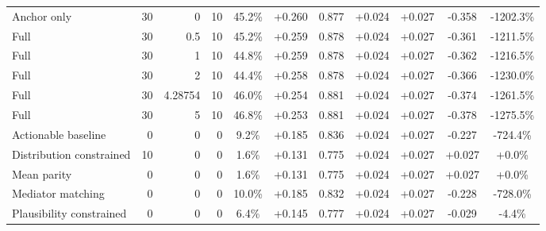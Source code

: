 \begin{table}[htbp]
\begin{tabular}{lrrrccccccc}
Anchor only & 30 & 0 & 10 & 45.2\% & +0.260 & 0.877 & +0.024 & +0.027 & -0.358 & -1202.3\% \\
Full & 30 & 0.5 & 10 & 45.2\% & +0.259 & 0.878 & +0.024 & +0.027 & -0.361 & -1211.5\% \\
Full & 30 & 1 & 10 & 44.8\% & +0.259 & 0.878 & +0.024 & +0.027 & -0.362 & -1216.5\% \\
Full & 30 & 2 & 10 & 44.4\% & +0.258 & 0.878 & +0.024 & +0.027 & -0.366 & -1230.0\% \\
Full & 30 & 4.28754 & 10 & 46.0\% & +0.254 & 0.881 & +0.024 & +0.027 & -0.374 & -1261.5\% \\
Full & 30 & 5 & 10 & 46.8\% & +0.253 & 0.881 & +0.024 & +0.027 & -0.378 & -1275.5\% \\
Actionable baseline & 0 & 0 & 0 & 9.2\% & +0.185 & 0.836 & +0.024 & +0.027 & -0.227 & -724.4\% \\
Distribution constrained & 10 & 0 & 0 & 1.6\% & +0.131 & 0.775 & +0.024 & +0.027 & +0.027 & +0.0\% \\
Mean parity & 0 & 0 & 0 & 1.6\% & +0.131 & 0.775 & +0.024 & +0.027 & +0.027 & +0.0\% \\
Mediator matching & 0 & 0 & 0 & 10.0\% & +0.185 & 0.832 & +0.024 & +0.027 & -0.228 & -728.0\% \\
Plausibility constrained & 0 & 0 & 0 & 6.4\% & +0.145 & 0.777 & +0.024 & +0.027 & -0.029 & -4.4\% \\
\bottomrule
\end{tabular}
\end{table}